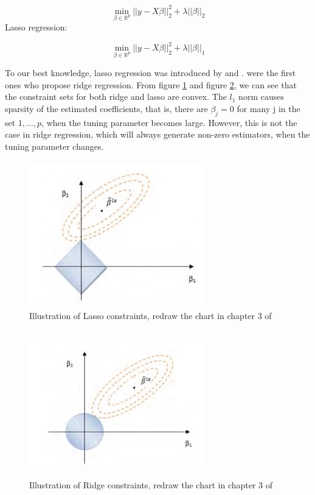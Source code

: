 \begin{equation}\label{en: ridge_dual}
\min_{\beta\in \mathbb{R}^p}||y-X\beta||_{2}^{2}+\lambda||\beta||_2 
\end{equation}
Lasso regression: 

\begin{equation}\label{en: lasso_dual}
\min_{\beta\in \mathbb{R}^p}||y-X\beta||_{2}^{2}+\lambda||\beta||_1 
\end{equation}

To our best knowledge,  lasso regression was introduced by \cite{tibshirani1996regression} and \cite{chen2001atomic}. \cite{hoerl1970ridge} were the first ones who propose ridge regression. From figure \ref{fig:lasso} and figure \ref{fig: ridge},  we can see that the constraint sets for both ridge and lasso are convex. The $l_1$ norm causes sparsity of the estimated coefficients,  that is,  there are $\beta_j=0$ for many j in the set ${1, ..., p}$,  when the tuning parameter becomes large.  However,  this is not the case in ridge regression,  which will always generate non-zero estimators,  when the tuning parameter changes.  
\begin{figure}[!htb]
 	\begin{center}
 		\includegraphics[width=3in, height=2.5in]{figures/lasso.jpg}
 	\end{center}
 	\caption{Illustration of Lasso constraints,  redraw the chart in chapter 3 of \cite{friedman2001elements}} \label{fig:lasso}
 \end{figure}
 
 \begin{figure}[!htb]
 	\begin{center}
 		\includegraphics[width=3in, height=2.5in]{figures/ridge.jpg}
 	\end{center}
 	\caption{Illustration of Ridge constraints,  redraw the chart in chapter 3 of \cite{friedman2001elements}} \label{fig: ridge}
 \end{figure}

